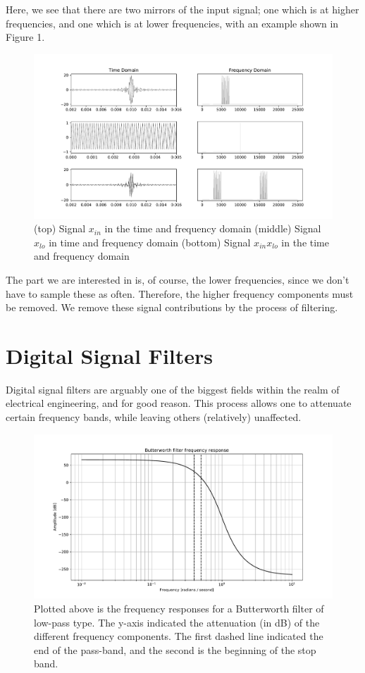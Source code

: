 \documentclass{report}
\begin{document}
Here, we see that there are two mirrors of the input signal; one which is at higher frequencies, and one which is at lower frequencies, with an example shown in Figure 1.  
\begin{figure}[ht]
\includegraphics[scale=.45]{Figure_1.pdf}
\caption{(top) Signal $x_{in}$ in the time and frequency domain (middle) Signal $x_{lo}$ in time and frequency domain (bottom) Signal $x_{in}x_{lo}$ in the time and frequency domain}
\end{figure}

The part we are interested in is, of course, the lower frequencies, since we don't have to sample these as often.  Therefore, the higher frequency components must be removed.  We remove these signal contributions by the process of filtering.

\section{Digital Signal Filters}

Digital signal filters are arguably one of the biggest fields within the realm of electrical engineering, and for good reason.  This process allows one to attenuate certain frequency bands, while leaving others (relatively) unaffected. 

\begin{figure}[ht]
\includegraphics[scale=.45]{Figure_2.pdf}
\caption{Plotted above is the frequency responses for a Butterworth filter of low-pass type.  The y-axis indicated the attenuation (in dB) of the different frequency components.  The first dashed line indicated the end of the pass-band, and the second is the beginning of the stop band.}
\end{figure} 
\end{document}
